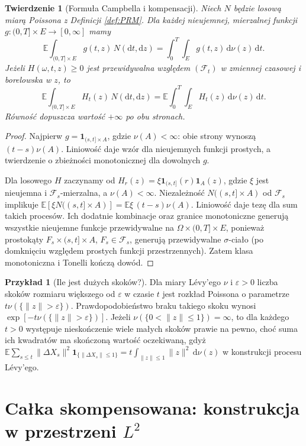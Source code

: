 \documentclass[11pt,a4paper,oneside]{report}
\numberwithin{equation}{chapter}
\theoremstyle{plain}
\newtheorem{twierdzenie}{Twierdzenie}[chapter]
\theoremstyle{definition}
\newtheorem{przyklad}{Przykład}[chapter]
\theoremstyle{remark}
\newcommand{\E}{\mathbb{E}}
\newcommand{\calF}{\mathcal{F}}
\newcommand{\ind}[1]{\mathbf{1}_{#1}}
\newcommand{\dd}{\mathrm{d}}
\begin{document}
\begin{twierdzenie}[Formuła Campbella i kompensacji]\label{thm:volIII:11:02}
\label{th:campbell}
Niech $N$ będzie losową miarą Poissona z Definicji
\ref{def:PRM}. Dla każdej nieujemnej, mierzalnej funkcji
$g:(0,T]\times E\to[0,\infty]$ mamy
\[
\E\int_{(0,T]\times E}g(t,z)\,N(\dd t,\dd z)
=\int_0^T\int_Eg(t,z)\,\dd\nu(z)\,\dd t.
\]
Jeżeli $H(\omega,t,z)\ge0$ jest przewidywalna względem
$(\calF_t)$ w zmiennej czasowej i borelowska w $z$, to
\[
\E\int_{(0,T]\times E} H_t(z)\,N(\dd t,\dd z)
=\E\int_0^T\int_E H_t(z)\,\dd\nu(z)\,\dd t.
\tag{11.1}\label{eq:compensation}
\]
Równość dopuszcza wartość $+\infty$ po obu stronach.
\end{twierdzenie}
\begin{proof}
Najpierw $g=\ind{(s,t]\times A}$, gdzie $\nu(A)<\infty$:
obie strony wynoszą $(t-s)\nu(A)$. Liniowość daje
wzór dla nieujemnych funkcji prostych, a twierdzenie o
zbieżności monotonicznej dla dowolnych $g$.

Dla losowego $H$ zaczynamy od
$H_r(z)=\xi\ind{(s,t]}(r)\ind A(z)$, gdzie $\xi$ jest
nieujemna i $\calF_s$-mierzalna, a $\nu(A)<\infty$.
Niezależność $N((s,t]\times A)$ od $\calF_s$ implikuje
$\E[\xi N((s,t]\times A)]=\E\xi\,(t-s)\nu(A)$.
Liniowość daje tezę dla sum takich procesów. Ich dodatnie
kombinacje oraz granice monotoniczne generują wszystkie
nieujemne funkcje przewidywalne na
$\Omega\times(0,T]\times E$, ponieważ prostokąty
$F_s\times(s,t]\times A$, $F_s\in\calF_s$,
generują przewidywalne $\sigma$-ciało (po domknięciu
względem prostych funkcji przestrzennych). Zatem
klasa monotoniczna i Tonelli kończą dowód.
\end{proof}

\begin{przyklad}[Ile jest dużych skoków?]
Dla miary Lévy'ego $\nu$ i $\varepsilon>0$ liczba skoków
rozmiaru większego od $\varepsilon$ w czasie $t$ jest
rozkład Poissona o parametrze $t\nu(\{\|z\|>\varepsilon\})$.
Prawdopodobieństwo braku takiego skoku wynosi
$\exp[-t\nu(\{\|z\|>\varepsilon\})]$.
Jeżeli $\nu(\{0<\|z\|\le1\})=\infty$, to dla każdego
$t>0$ występuje nieskończenie wiele małych skoków
prawie na pewno, choć suma ich kwadratów ma skończoną
wartość oczekiwaną, gdyż
$\E\sum_{s\le t}\|\Delta X_s\|^2\ind{\{\|\Delta X_s\|\le1\}}
=t\int_{\|z\|\le1}\|z\|^2\,\dd\nu(z)$ w konstrukcji
procesu Lévy'ego.
\end{przyklad}

\section[Całka skompensowana: konstrukcja w L2]{Całka skompensowana: konstrukcja w przestrzeni $L^2$}\label{sec:volIII:11:03}
\end{document}
